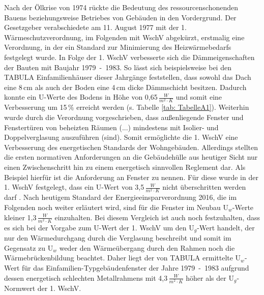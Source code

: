 Nach der Ölkrise von 1974 rückte die Bedeutung des ressourcenschonenden Bauens beziehungsweise Betriebes von Gebäuden in den Vordergrund. 
Der Gesetzgeber verabschiedete am 11. August 1977 mit der 1. Wärmeschutzverordnung, im Folgenden mit WschV abgekürzt, erstmalig eine Verordnung, in der ein Standard zur Minimierung des Heizwärmebedarfs festgelegt wurde. 
In Folge der 1. WschV verbesserte sich die Dämmeigenschaften der Bauten mit Baujahr \mbox{1979 - 1983}.
So lässt sich beispielsweise bei den TABULA Einfamilienhäuser dieser Jahrgänge feststellen, dass sowohl das Dach eine 8\,cm als auch der Boden eine 4\,cm dicke Dämmschicht besitzen. 
Dadurch konnte ein U-Werte des Bodens in Höhe von 0,65\,\(\frac{W}{m^2 \cdot K} \) und somit eine Verbesserung um 15\,\% erreicht werden (s. Tabelle \ref{tab: TabelleA1}).
Weiterhin wurde durch die Verordnung vorgeschrieben, dass \glqq außenliegende Fenster und Fenstertüren von beheizten Räumen (...) mindestens mit Isolier- und Doppelverglasung auszuführen (sind)\grqq \cite{Bundesregierung.1977}.
Somit ermöglichte die 1. WschV eine Verbesserung des energetischen Standards der Wohngebäuden. 
Allerdings stellten die ersten normativen Anforderungen an die Gebäudehülle aus heutiger Sicht nur einen Zwischenschritt hin zu einem energetisch sinnvollen Reglement dar.
Als Beispiel hierfür ist die Anforderung an Fenster zu nennen. 
Für diese wurde in der 1. WschV festgelegt, dass ein U-Wert von 3,5\,\(\frac{W}{m^2 \cdot K} \) nicht überschritten werden darf \cite{Bundesregierung.1977}.
Nach heutigem Standard der Energieeinsparverordnung 2016, die im Folgenden noch weiter erläutert wird, sind für die Fenster im Neubau U\(_w\)-Werte kleiner 1,3\,\(\frac{W}{m^2 \cdot K} \) einzuhalten.
Bei diesem Vergleich ist auch noch festzuhalten, dass es sich bei der Vorgabe zum U-Wert der 1. WschV um den U\(_g\)-Wert handelt, der nur den Wärmedurchgang durch die Verglasung beschreibt und somit im Gegensatz zu U\(_w\) weder den Wärmeübergang durch den Rahmen noch die Wärmebrückenbildung beachtet. 
Daher liegt der von TABULA ermittelte U\(_w\)-Wert für das Einfamilien-Typgebäudenfenster der Jahre \mbox{1979 - 1983} aufgrund dessen energetisch schlechten Metallrahmens mit 4,3\,\(\frac{W}{m^2 \cdot K} \) höher als der U\(_g\)-Normwert der 1. WschV. \cite{EickeHenning.2011} 

